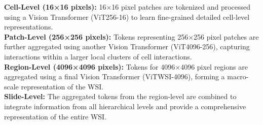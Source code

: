 \documentclass[
11pt, %
english, %
singlespacing, %
headsepline, %
]{project_structure}
\newcommand{\subpar}[1]{\paragraph*{#1}}
\begin{document}
    \noindent \textbf{Cell-Level (16×16 pixels):} 
    16×16 pixel patches are tokenized and processed using a Vision Transformer (ViT256-16) to learn fine-grained detailed cell-level representations.\\
    
    \noindent \textbf{Patch-Level (256×256 pixels):} 
    Tokens representing 256×256 pixel patches are further aggregated using another Vision Transformer (ViT4096-256), capturing interactions within a larger local clusters of cell interactions.\\
    
    \noindent \textbf{Region-Level (4096×4096 pixels):} 
    Tokens for 4096×4096 pixel regions are aggregated using a final Vision Transformer (ViTWSI-4096), forming a macro-scale representation of the \acrshort{WSI}.\\
    
    \noindent \textbf{Slide-Level:} The aggregated tokens from the region-level are combined to integrate information from all hierarchical levels and provide a comprehensive representation of the entire \acrshort{WSI}.\\

\end{document}
